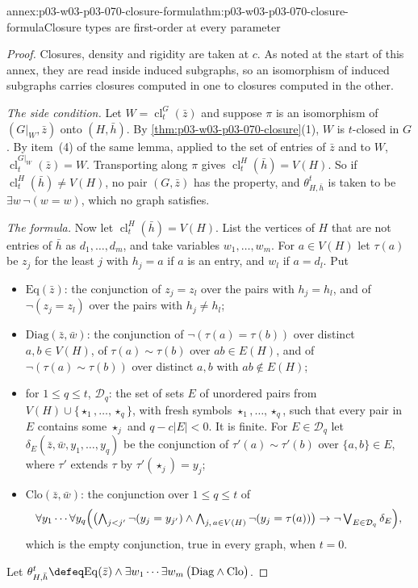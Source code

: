 \begin{annexitem}{annex:p03-w03-p03-070-closure-formula}{thm:p03-w03-p03-070-closure-formula}{Closure types are first-order at every parameter}
\begin{proof}
Closures, density and rigidity are taken at \(c\).  As noted at the start of
this annex, they are read inside induced subgraphs, so an isomorphism of
induced subgraphs carries closures computed in one to closures computed in
the other.

\emph{The side condition.}  Let \(W=\operatorname{cl}^G_t(\bar z)\) and
suppose \(\pi\) is an isomorphism of \((G|_W,\bar z)\) onto \((H,\bar h)\).
By \cref{thm:p03-w03-p03-070-closure}(1), \(W\) is \(t\)-closed in \(G\).  By
item~(4) of the same lemma, applied to the set of entries of \(\bar z\) and
to \(W\), \(\operatorname{cl}^{G|_W}_t(\bar z)=W\).  Transporting along
\(\pi\) gives \(\operatorname{cl}^H_t(\bar h)=V(H)\).  So if
\(\operatorname{cl}^H_t(\bar h)\neq V(H)\), no pair \((G,\bar z)\) has the
property, and \(\theta^t_{H,\bar h}\) is taken to be \(\exists w\,\neg(w=w)\),
which no graph satisfies.

\emph{The formula.}  Now let \(\operatorname{cl}^H_t(\bar h)=V(H)\).  List
the vertices of \(H\) that are not entries of \(\bar h\) as
\(d_1,\ldots,d_m\), and take variables \(w_1,\ldots,w_m\).  For
\(a\in V(H)\) let \(\tau(a)\) be \(z_j\) for the least \(j\) with
\(h_j=a\) if \(a\) is an entry, and \(w_l\) if \(a=d_l\).  Put
\begin{itemize}
\item \(\mathrm{Eq}(\bar z)\): the conjunction of \(z_j=z_l\) over the pairs
      with \(h_j=h_l\), and of \(\neg(z_j=z_l)\) over the pairs with
      \(h_j\neq h_l\);
\item \(\mathrm{Diag}(\bar z,\bar w)\): the conjunction of
      \(\neg(\tau(a)=\tau(b))\) over distinct \(a,b\in V(H)\), of
      \(\tau(a)\sim\tau(b)\) over \(ab\in E(H)\), and of
      \(\neg(\tau(a)\sim\tau(b))\) over distinct \(a,b\) with
      \(ab\notin E(H)\);
\item for \(1\leq q\leq t\), \(\mathcal D_q\): the set of sets \(E\) of
      unordered pairs from \(V(H)\cup\{\star_1,\ldots,\star_q\}\), with
      fresh symbols \(\star_1,\ldots,\star_q\), such that every pair in
      \(E\) contains some \(\star_j\) and \(q-c|E|<0\).  It is finite.  For
      \(E\in\mathcal D_q\) let \(\delta_E(\bar z,\bar w,y_1,\ldots,y_q)\) be
      the conjunction of \(\tau'(a)\sim\tau'(b)\) over \(\{a,b\}\in E\), where
      \(\tau'\) extends \(\tau\) by \(\tau'(\star_j)=y_j\);
\item \(\mathrm{Clo}(\bar z,\bar w)\): the conjunction over \(1\leq q\leq t\)
      of
      \[
        \forall y_1\cdots\forall y_q\Bigl(\bigl(\textstyle\bigwedge_{j<j'}
        \neg(y_j=y_{j'})\wedge\bigwedge_{j,\,a\in V(H)}\neg(y_j=\tau(a))\bigr)
        \to\neg\bigvee_{E\in\mathcal D_q}\delta_E\Bigr),
      \]
      which is the empty conjunction, true in every graph, when \(t=0\).
\end{itemize}
Let \(\theta^t_{H,\bar h}\defeq\mathrm{Eq}(\bar z)\wedge\exists w_1\cdots
\exists w_m\,\bigl(\mathrm{Diag}\wedge\mathrm{Clo}\bigr)\).


\end{proof}
\end{annexitem}
